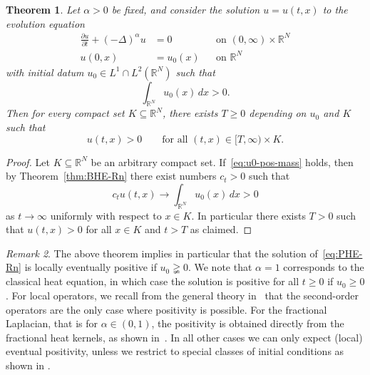 \documentclass[a4paper, reqno,titlepage]{amsart}
\numberwithin{equation}{section}
\theoremstyle{plain}
\newtheorem{theorem}{Theorem}[section]
\theoremstyle{definition}
\theoremstyle{remark}
\newtheorem{remark}[theorem]{Remark}
\newcommand{\RR}{\mathbb{R}}
\begin{document}
\begin{theorem}
  Let $\alpha > 0$ be fixed, and consider the solution $u = u(t,x)$ to the evolution equation
  \begin{equation}
    \label{eq:PHE-Rn}
    \begin{aligned}
      \frac{\partial u}{\partial t} + (-\Delta)^\alpha u & = 0
                                                         &          & \text{on } (0, \infty) \times \RR^N \\
      u(0, x)                                            & = u_0(x)
                                                         &          & \text{on } \RR^N
    \end{aligned}
  \end{equation}
  with initial datum $u_0 \in L^1 \cap L^2(\RR^N)$ such that
  \begin{equation}
    \label{eq:u0-pos-mass}
    \int_{\RR^N} u_0(x) \,dx>0.
  \end{equation}
  Then for every compact set $K \subseteq \RR^N$, there exists $T \geq 0$ depending on $u_0$ and $K$ such that
  \begin{equation*}
    u(t,x) > 0 \qquad \text{for all } (t,x)\in[T,\infty)\times K.
  \end{equation*}
\end{theorem}
\begin{proof}
  Let $K \subseteq \RR^N$ be an arbitrary compact set. If~\eqref{eq:u0-pos-mass} holds, then by Theorem~\ref{thm:BHE-Rn} there exist numbers $c_t > 0$ such that
  \begin{equation*}
    c_t u(t,x) \longrightarrow \int_{\RR^N} u_0(x) \,dx > 0
  \end{equation*}
  as $t \to \infty$ uniformly with respect to  $x\in K$. In particular there exists $T>0$ such that $u(t,x)>0$ for all $x\in K$ and $t>T$ as claimed.
\end{proof}
\begin{remark}
  The above theorem implies in particular that the solution of~\eqref{eq:PHE-Rn} is locally eventually positive if $u_0\gneqq 0$. We note that $\alpha=1$ corresponds to the classical heat equation, in which case the solution is positive for all $t\geq 0$ if $u_0\geq 0$. For local operators, we recall from the general theory in~\cite[Theorem~2.1]{ABR90} that the second-order operators are the only case where positivity is possible. For the fractional Laplacian, that is for $\alpha\in (0,1)$, the positivity is obtained directly from the fractional heat kernels, as shown in~\cite[Section 2]{VAZ}. In all other cases we can only expect (local) eventual positivity, unless we restrict to special classes of initial conditions as shown in \cite{GMO}.
\end{remark}
\end{document}
